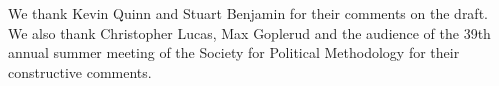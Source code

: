 We thank Kevin Quinn and Stuart Benjamin for their comments on the draft. We also thank Christopher Lucas, Max Goplerud and the audience of the 39th annual summer meeting of the Society for Political Methodology for their constructive comments.